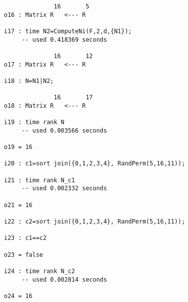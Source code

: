 \documentclass[fleqn,reqno]{amsart}
\begin{document}
\begin{example}[$\mt{ex604}$]
\begin{verbatim}
              16       5
o16 : Matrix R   <--- R

i17 : time N2=ComputeNi(F,2,d,{N1});
     -- used 0.418369 seconds

              16       12
o17 : Matrix R   <--- R

i18 : N=N1|N2;

              16       17
o18 : Matrix R   <--- R

i19 : time rank N
     -- used 0.003566 seconds

o19 = 16

i20 : c1=sort join({0,1,2,3,4}, RandPerm(5,16,11));

i21 : time rank N_c1
     -- used 0.002332 seconds

o21 = 16

i22 : c2=sort join({0,1,2,3,4}, RandPerm(5,16,11));

i23 : c1==c2

o23 = false

i24 : time rank N_c2
     -- used 0.002814 seconds

o24 = 16
\end{verbatim}
\end{example}
\end{document}
